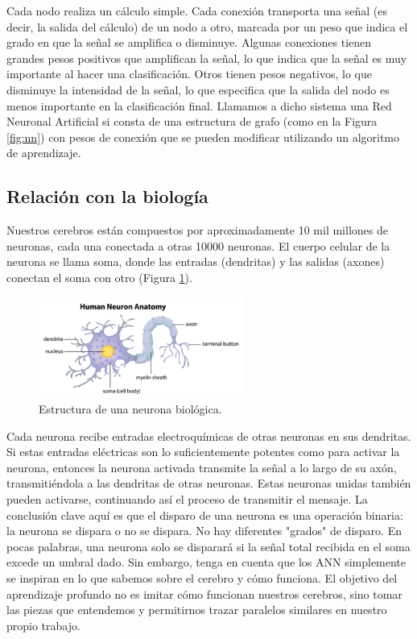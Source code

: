 \documentclass[a4paper,12pt]{article}
\begin{document}
Cada nodo realiza un cálculo simple. Cada conexión transporta una señal (es decir, la salida del cálculo) de un nodo a otro, marcada por un peso que indica el grado en que la señal se amplifica o disminuye. Algunas conexiones tienen grandes pesos positivos que amplifican la señal, lo que indica que la señal es muy importante al hacer una clasificación. Otros tienen pesos negativos, lo que disminuye la intensidad de la señal, lo que especifica que la salida del nodo es menos importante en la clasificación final. Llamamos a dicho sistema una Red Neuronal Artificial si consta de una estructura de grafo (como en la Figura \ref{fig:nn}) con pesos de conexión que se pueden modificar utilizando un algoritmo de aprendizaje.

\subsection{Relación con la biología}
Nuestros cerebros están compuestos por aproximadamente 10 mil millones de neuronas, cada una conectada a otras 10000 neuronas. El cuerpo celular de la neurona se llama soma, donde las entradas (dendritas) y las salidas (axones) conectan el soma con otro (Figura \ref{fig:realneuron}).

\begin{figure}[H]
	\begin{center}				
	\includegraphics[width=0.6\textwidth]{019.png}
  	\caption{Estructura de una neurona biológica.}
  	\label{fig:realneuron}
  	\end{center}
\end{figure}


Cada neurona recibe entradas electroquímicas de otras neuronas en sus dendritas. Si estas entradas eléctricas son lo suficientemente potentes como para activar la neurona, entonces la neurona activada transmite la señal a lo largo de su axón, transmitiéndola a las dendritas de otras neuronas. Estas neuronas unidas también pueden activarse, continuando así el proceso de transmitir el mensaje.
La conclusión clave aquí es que el disparo de una neurona es una operación binaria: la neurona se dispara o no se dispara. No hay diferentes "grados" de disparo. En pocas palabras, una neurona solo se disparará si la señal total recibida en el soma excede un umbral dado.
Sin embargo, tenga en cuenta que los ANN simplemente se inspiran en lo que sabemos sobre el cerebro y cómo funciona. El objetivo del aprendizaje profundo no es imitar cómo funcionan nuestros cerebros, sino tomar las piezas que entendemos y permitirnos trazar paralelos similares en nuestro propio trabajo.
\end{document}
